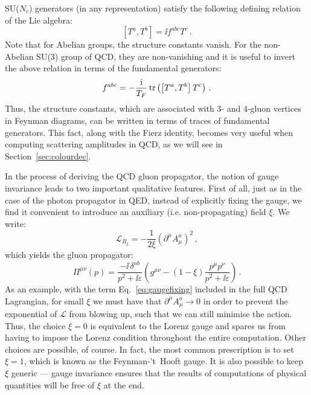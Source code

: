 \documentclass[main.tex]{subfiles}
\begin{document}
SU($N_c$) generators (in any representation) satisfy the following defining relation of the Lie algebra:
\begin{equation} \label{eq:liealgebra}
    \left[T^a, T^b\right] = \ii f^{abc} T^c\,.
\end{equation}
Note that for Abelian groups, the structure constants vanish. For the non-Abelian SU(3) group of QCD, they are non-vanishing and it is useful to invert the above relation in terms of the fundamental generators:
\begin{equation} \label{eq:fabc}
    f^{abc} = -\frac{\mathrm{i}}{T_F} \operatorname{\rm tr} \left(\left[T^a, T^b \right] T^c \right)\,.
\end{equation}
Thus, the structure constants, which are associated with 3- and 4-gluon vertices in Feynman diagrams, can be written in terms of traces of fundamental generators. This fact, along with the Fierz identity, becomes very useful when computing scattering amplitudes in QCD, as we will see in Section~\ref{sec:colourdec}.

In the process of deriving the QCD gluon propagator, the notion of gauge invariance leads to two important qualitative features. First of all, just as in the case of the photon propagator in QED, instead of explicitly fixing the gauge, we find it convenient to introduce an auxiliary (i.e. non-propagating) field $\xi$. We write:
\begin{equation} \label{eq:gaugefixing}
    \mathcal{L}_{R_\xi} = -\frac{1}{2 \xi} \left(\partial^\mu A^a_\mu \right)^2\,,
\end{equation}
which yields the gluon propagator:
\begin{equation}
    \Pi^{\mu\nu}(p) = \frac{-\ii \, \delta^{ab}}{p^2+ \ii \varepsilon} \left(g^{\mu\nu} - (1-\xi) \frac{p^\mu p^\nu}{p^2+\ii \varepsilon} \right)\,.
\end{equation}
As an example, with the term Eq.~\ref{eq:gaugefixing} included in the full QCD Lagrangian, for small $\xi$ we must have that $\partial^\mu A^a_\mu \rightarrow 0$ in order to prevent the exponential of $\mathcal{L}$ from blowing up, such that we can still minimise the action. Thus, the choice $\xi = 0$ is equivalent to the Lorenz gauge and spares us from having to impose the Lorenz condition throughout the entire computation. Other choices are possible, of course. In fact, the most common prescription is to set $\xi = 1$, which is known as the \mbox{Feynman-'t Hooft} gauge. It is also possible to keep $\xi$ generic --- gauge invariance ensures that the results of computations of physical quantities will be free of $\xi$ at the end.
\end{document}
